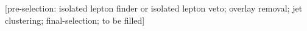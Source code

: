 [pre-selection: isolated lepton finder or isolated lepton veto; overlay removal; jet clustering; 
final-selection; to be filled]

